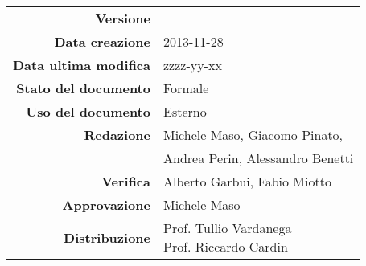 

\newcommand{\Versione}{\versioneGlossario{}}
\newcommand{\Data}{2013-11-28}
\newcommand{\DataUltimaModifica}{zzzz-yy-xx}
\newcommand{\TipoDocumento}{Glossario}
\newcommand{\Lettera}[1]{\huge #1}
\newcommand{\Riga}{\\\rule[2mm]{\textwidth}{0.25mm}}
\newcommand{\Termine}{\emph}
\newcommand{\Inizio}{}

\newcommand{\paginaGlossario}[1]{
\newpage
\setcounter{secnumdepth}{0} %
\section{\Lettera{#1}}
}

\newcommand{\elemento}[2]{
\setcounter{secnumdepth}{0} %
\subsection{#1}
\begin{quote}
{#2}
\end{quote}
}



\begin{center}

\begin{tabular}{r|l}
\textbf{Versione} & \Versione\\
\textbf{Data creazione} & \Data \\
\textbf{Data ultima modifica} & \DataUltimaModifica \\
\textbf{Stato del documento} & Formale \\
\textbf{Uso del documento} & Esterno \\
\textbf{Redazione} & Michele Maso, Giacomo Pinato,\\
                   & Andrea Perin, Alessandro Benetti\\
\textbf{Verifica} & Alberto Garbui, Fabio Miotto \\
\textbf{Approvazione} & Michele Maso \\
\textbf{Distribuzione} & \parbox[t]{4cm}{Prof. Tullio Vardanega \\ Prof. Riccardo Cardin \\ \Prop{} } \\
\end{tabular}
\end{center}
\vspace{.01in}

